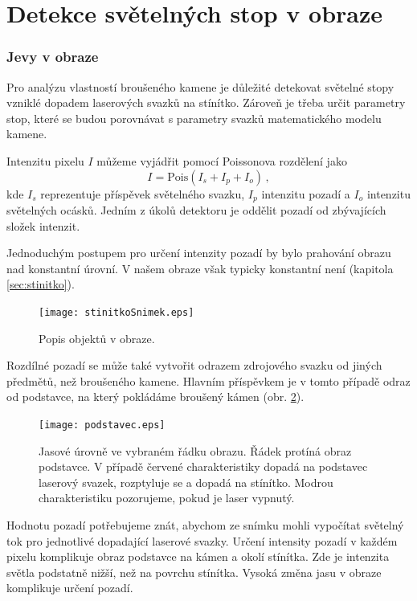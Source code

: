 \part{Detekce světelných stop v obraze}
\label{sec:detection}

\section{Jevy v obraze}
Pro analýzu vlastností broušeného kamene je důležité detekovat světelné stopy vzniklé dopadem laserových svazků na stínítko. Zároveň je třeba určit parametry stop, které se budou porovnávat s parametry svazků matematického modelu kamene. 

Intenzitu pixelu $I$ můžeme vyjádřit pomocí Poissonova rozdělení jako 
\begin{equation}
	I = \mathrm{Pois}\left(I_{s}+I_{p}+I_{o}\right)\,,
	\label{eq:intensitu_sum}
\end{equation}
 kde $I_{s}$ reprezentuje příspěvek světelného svazku, $I_{p}$ intenzitu pozadí a $I_{o}$ intenzitu světelných ocásků. Jedním z úkolů detektoru je oddělit pozadí od zbývajících složek intenzit. %
 
Jednoduchým postupem pro určení intenzity pozadí by bylo prahování obrazu nad konstantní úrovní. V našem obraze však typicky konstantní není (kapitola \ref{sec:stinitko}). 

\begin{figure}[h!]
\centering
\texttt{[image: stinitkoSnimek.eps]}
\caption[Popis objektů v obraze.]{Popis objektů v obraze.}
\label{fig: podstavec}
\end{figure}


Rozdílné pozadí se může také vytvořit odrazem zdrojového svazku od jiných předmětů, než broušeného kamene. Hlavním příspěvkem je v tomto případě odraz od podstavce, na který pokládáme broušený kámen (obr. \ref{fig: podstavec}).

\begin{figure}[h!]
\centering
\texttt{[image: podstavec.eps]}
\caption[Vliv odrazu od podstavce na pozadí snímku.]{Jasové úrovně ve vybraném řádku obrazu. Řádek protíná obraz podstavce. V případě červené charakteristiky dopadá na podstavec laserový svazek, rozptyluje se a dopadá na stínítko. Modrou charakteristiku pozorujeme, pokud je laser vypnutý.}
\label{fig: podstavec}
\end{figure}

Hodnotu pozadí potřebujeme znát, abychom ze snímku mohli vypočítat světelný tok pro jednotlivé dopadající laserové svazky. Určení intensity pozadí v každém pixelu komplikuje obraz podstavce na kámen a okolí stínítka. Zde je intenzita světla podstatně nižší, než na povrchu stínítka. Vysoká změna jasu v obraze komplikuje určení pozadí.  

